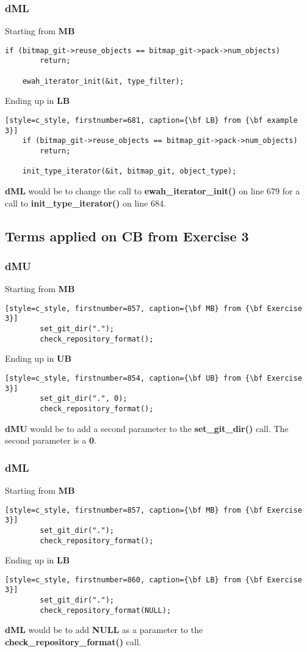 \subsubsection{dML}
Starting from {\bf MB}
\begin{lstlisting}[style=c_style, firstnumber=676, caption=One {\bf MB} from {\bf example 3}]
	if (bitmap_git->reuse_objects == bitmap_git->pack->num_objects)
		return;

	ewah_iterator_init(&it, type_filter);
\end{lstlisting}
Ending up in {\bf LB}
\begin{lstlisting}[style=c_style, firstnumber=681, caption={\bf LB} from {\bf example 3}]
	if (bitmap_git->reuse_objects == bitmap_git->pack->num_objects)
		return;

	init_type_iterator(&it, bitmap_git, object_type);
\end{lstlisting}
{\bf dML} would be to change the call to {\bf ewah\_iterator\_init()} on line 679 for a call to
{\bf init\_type\_iterator()} on line 684.

\subsection{Terms applied on CB from Exercise 3}
\subsubsection{dMU}
Starting from {\bf MB}
\begin{lstlisting}[style=c_style, firstnumber=857, caption={\bf MB} from {\bf Exercise 3}]
		set_git_dir(".");
		check_repository_format();
\end{lstlisting}
Ending up in {\bf UB}
\begin{lstlisting}[style=c_style, firstnumber=854, caption={\bf UB} from {\bf Exercise 3}]
		set_git_dir(".", 0);
		check_repository_format();
\end{lstlisting}
{\bf dMU} would be to add a second parameter to the {\bf set\_git\_dir()} call. The second parameter is a {\bf 0}.

\subsubsection{dML}
Starting from {\bf MB}
\begin{lstlisting}[style=c_style, firstnumber=857, caption={\bf MB} from {\bf Exercise 3}]
		set_git_dir(".");
		check_repository_format();
\end{lstlisting}
Ending up in {\bf LB}
\begin{lstlisting}[style=c_style, firstnumber=860, caption={\bf LB} from {\bf Exercise 3}]
		set_git_dir(".");
		check_repository_format(NULL);
\end{lstlisting}
{\bf dML} would be to add {\bf NULL} as a parameter to the {\bf check\_repository\_format()} call.

